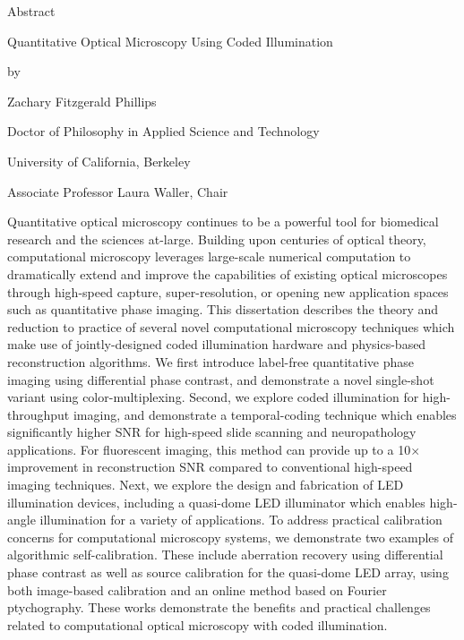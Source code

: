 \setcounter{page}{1}

\begin{center}
    Abstract

    \vspace{0.4cm}
     Quantitative Optical Microscopy Using Coded Illumination

    \vspace{0.4cm}

    by

    \vspace{0.4cm}
    Zachary Fitzgerald Phillips

     \vspace{0.4cm}
     Doctor of Philosophy in Applied Science and Technology

     \vspace{0.4cm}
     University of California, Berkeley

     \vspace{0.4cm}
     Associate Professor Laura Waller, Chair

    \vspace{0.8cm}


\end{center}


Quantitative optical microscopy continues to be a powerful tool for biomedical research and the sciences at-large. Building upon centuries of optical theory, computational microscopy leverages large-scale numerical computation to dramatically extend and improve the capabilities of existing optical microscopes through high-speed capture, super-resolution, or opening new application spaces such as quantitative phase imaging. This dissertation describes the theory and reduction to practice of several novel computational microscopy techniques which make use of jointly-designed coded illumination hardware and physics-based reconstruction algorithms. We first introduce label-free quantitative phase imaging using differential phase contrast, and demonstrate a novel single-shot variant using color-multiplexing. Second, we explore coded illumination for high-throughput imaging, and demonstrate a temporal-coding technique which enables significantly higher SNR for high-speed slide scanning and neuropathology applications. For fluorescent imaging, this method can provide up to a 10$\times$ improvement in reconstruction SNR compared to conventional high-speed imaging techniques. Next, we explore the design and fabrication of LED illumination devices, including a quasi-dome LED illuminator which enables high-angle illumination for a variety of applications. To address practical calibration concerns for computational microscopy systems, we demonstrate two examples of algorithmic self-calibration. These include aberration recovery using differential phase contrast as well as source calibration for the quasi-dome LED array, using both image-based calibration and an online method based on Fourier ptychography. These works demonstrate the benefits and practical challenges related to computational optical microscopy with coded illumination.

